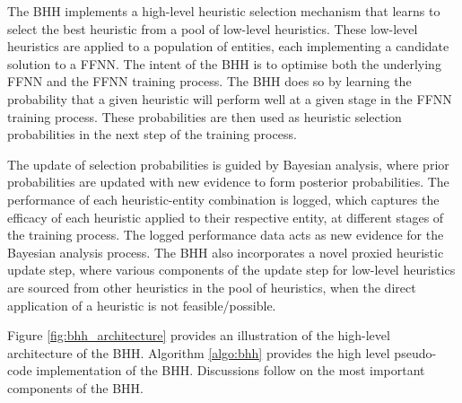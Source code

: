 \documentclass[preprint,review,12pt]{elsarticle}
\begin{document}
The \acs{BHH} implements a high-level heuristic selection mechanism that learns to select the best heuristic from a pool of low-level heuristics. These low-level heuristics are applied to a population of entities, each implementing a candidate solution to a \acs{FFNN}. The intent of the \acs{BHH} is to optimise both the underlying \acs{FFNN} and the \acs{FFNN} training process. The \acs{BHH} does so by learning the probability that a given heuristic will perform well at a given stage in the \acs{FFNN} training process. These probabilities are then used as heuristic selection probabilities in the next step of the training process.

The update of selection probabilities is guided by Bayesian analysis, where prior probabilities are updated with new evidence to form posterior probabilities. The performance of each heuristic-entity combination is logged, which captures the efficacy of each heuristic applied to their respective entity, at different stages of the training process. The logged performance data acts as new evidence for the Bayesian analysis process. The \acs{BHH} also incorporates a novel proxied heuristic update step, where various components of the update step for low-level heuristics are sourced from other heuristics in the pool of heuristics, when the direct application of a heuristic is not feasible/possible.

Figure \ref{fig:bhh_architecture} provides an illustration of the high-level architecture of the \acs{BHH}. Algorithm \ref{algo:bhh} provides the high level pseudo-code implementation of the \acs{BHH}. Discussions follow on the most important components of the \acs{BHH}.
\end{document}
